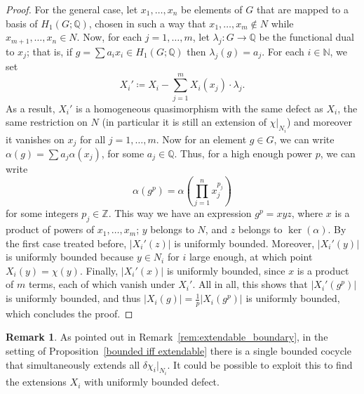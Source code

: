 \documentclass[svgnames]{amsart}
\theoremstyle{plain}
\theoremstyle{definition}
\newtheorem{rem}[thm]{Remark}
\begin{document}
\begin{proof}
    For the general case, let $x_1, \ldots, x_n$ be elements of $G$ that are mapped to a basis of $H_1(G; \mathbb{Q})$, chosen in such a way that $x_1, \ldots, x_m \notin N$ while $x_{m+1}, \ldots, x_n \in N$. Now, for each $j = 1, \ldots, m$, let $\lambda_j \colon G \to \mathbb{Q}$ be the functional dual to $x_j$; that is, if $g = \sum a_i x_i \in H_1(G; \mathbb{Q})$ then $\lambda_j(g) = a_j$. For each $i \in \mathbb{N}$, we set
    \[X_i' \coloneqq X_i - \sum\limits_{j = 1}^m X_i(x_j) \cdot \lambda_j.\]
    As a result, $X_i'$ is a homogeneous quasimorphism with the same defect as $X_i$, the same restriction on $N$ (in particular it is still an extension of $\chi|_{N_i}$) and moreover it vanishes on $x_j$ for all $j = 1, \ldots, m$. Now for an element $g \in G$, we can write $\alpha(g) = \sum a_j \alpha(x_j)$, for some $a_j \in \mathbb{Q}$. Thus, for a high enough power $p$, we can write
    \[\alpha(g^p) = \alpha\left( \prod\limits_{j = 1}^n x_j^{p_j} \right)\]
    for some integers $p_j \in \mathbb{Z}$. This way we have an expression $g^p = x y z$, where $x$ is a product of powers of $x_1, \ldots, x_m$; $y$ belongs to $N$, and $z$ belongs to $\ker(\alpha)$. By the first case treated before, $|X_i'(z)|$ is uniformly bounded. Moreover, $|X_i'(y)|$ is uniformly bounded because $y \in N_i$ for $i$ large enough, at which point $X_i(y) = \chi(y)$. Finally, $|X_i'(x)|$ is uniformly bounded, since $x$ is a product of $m$ terms, each of which vanish under $X_i'$. All in all, this shows that $|X_i'(g^p)|$ is uniformly bounded, and thus $|X_i(g)| = \frac{1}{p} |X_i(g^p)|$ is uniformly bounded, which concludes the proof.
\end{proof}

\begin{rem}
    As pointed out in Remark~\ref{rem:extendable_boundary}, in the setting of Proposition~\ref{bounded iff extendable} there is a single bounded cocycle that simultaneously extends all $\delta \chi_i|_{N_i}$. It could be possible to exploit this to find the extensions $X_i$ with uniformly bounded defect.
\end{rem}
\end{document}
